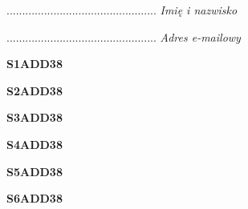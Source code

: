 \begin{turn}{90}\begin{minipage}{\linewidth} \vspace{20mm} ................................................  \textit{Imię i nazwisko}\end{minipage}\end{turn}

\begin{turn}{90}\begin{minipage}{\linewidth} \vspace{20mm} ................................................  \textit{Adres e-mailowy}\end{minipage}\end{turn}

\begin{turn}{90}\huge \begin{minipage}{\linewidth} \vspace{10mm}\textbf{S1ADD38}\end{minipage}\end{turn}

\begin{turn}{90}\huge \begin{minipage}{\linewidth} \vspace{10mm}\textbf{S2ADD38}\end{minipage}\end{turn}

\begin{turn}{90}\huge \begin{minipage}{\linewidth} \vspace{10mm}\textbf{S3ADD38}\end{minipage}\end{turn}

\begin{turn}{90}\huge \begin{minipage}{\linewidth} \vspace{10mm}\textbf{S4ADD38}\end{minipage}\end{turn}

\begin{turn}{90}\huge \begin{minipage}{\linewidth} \vspace{10mm}\textbf{S5ADD38}\end{minipage}\end{turn}

\begin{turn}{90}\huge \begin{minipage}{\linewidth} \vspace{10mm}\textbf{S6ADD38}\end{minipage}\end{turn}


